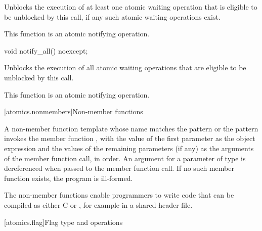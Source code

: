 \begin{itemdescr}
\pnum
\effects
Unblocks the execution of at least one atomic waiting operation
that is eligible to be unblocked by this call,
if any such atomic waiting operations exist.

\pnum
\remarks
This function is an atomic notifying operation.
\end{itemdescr}

%
\begin{itemdecl}
void notify_all() noexcept;
\end{itemdecl}

\begin{itemdescr}
\pnum
\effects
Unblocks the execution of all atomic waiting operations
that are eligible to be unblocked by this call.

\pnum
\remarks
This function is an atomic notifying operation.
\end{itemdescr}

[atomics.nonmembers]{Non-member functions}

\pnum
A non-member function template whose name matches the pattern
 or the pattern 
invokes the member function , with the value of the
first parameter as the object expression and the values of the remaining parameters
(if any) as the arguments of the member function call, in order. An argument
for a parameter of type  is dereferenced when
passed to the member function call.
If no such member function exists, the program is ill-formed.

\pnum
\begin{note}
The non-member functions enable programmers to write code that can be
compiled as either C or \Cpp{}, for example in a shared header file.
\end{note}

[atomics.flag]{Flag type and operations}

